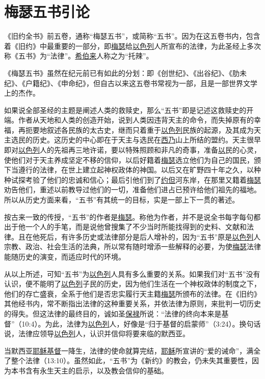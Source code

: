 \chapter{梅瑟五书引论}

《旧约全书》前五卷，通称“梅瑟五书”，或简称“五书”。因为在这五卷书内，包含着《旧约》中最重要的一部分，即\uline{梅瑟}给\uline{以色列}人所宣布的法律，为此圣经上多次称《五书》为“法律”。\uline{希伯来}人称之为“托辣”。

《梅瑟五书》虽然在纪元前已有如此的分划：即《创世纪》、《出谷纪》、《肋未纪》、《户籍纪》、《申命纪》，但自古以来这五卷书常视为一部，且是一部世界文学上的杰作。

如果说全部圣经的主题是阐述人类的救赎史，那么“五书”即是记述这救赎史的开端。作者从天地和人类的创造开始，说到人类因违背天主的命令，而失掉原有的幸福，再扼要地叙述各民族的太古史，继而只着重于\uline{以色列}民族的起源，及其成为天主选民的历史。这历史的中心即在于天主与选民在\uline{西乃}山上所结的盟约。天主很早即对\uline{以色列}人的先祖再三地许诺，要以特殊照顾和非凡的奇事，准备\uline{以}民的心灵，使他们对于天主养成坚定不移的信仰，以后好籍着\uline{梅瑟}选立他们为自己的国民，颁下当遵行的法律，在世上建立起神权政体的神国。以后又在旷野四十年之久，以种种试探考验了他们的忠诚和信心；最后引他们到了\uline{约但}河东岸，在那里又籍着\uline{梅瑟}劝告他们，重述以前教导过他们的一切，准备他们进占已预许给他们祖先的福地。所以从历史方面来看，“五书”有其统一的目标，实是一部上下一贯的著述。

按古来一致的传授，“五书”的作者是\uline{梅瑟}。称他为作者，并不是说全书每字每句都出于他一个人的手笔，而是说他曾搜集了不少当时所能找得到的史料、文献和法律。且在他死后，有许多历史或法律部分是后人增补的，因为“五书”原是\uline{以色列}人宗教、政治、社会生活的法典，所以常有随时增添一些解释的必要，为使\uline{梅瑟}法律能随历史的演变，而适应时代的环境。

从以上所述，可知“五书”为\uline{以色列}人具有多么重要的关系。如果我们对“五书”没有认识，便不能明了\uline{以色列}子民的历史，因为他们生活在一个神权政体的制度之下，他们的存亡盛衰，全系于他们是否忠实履行天主籍\uline{梅瑟}所颁布的法律。在《旧约》其他经书内，常不断指出法律的这种重要关系，并依法律为原则，来批判一切历史的得失。但这法律的最终目的，诚如圣\uline{保禄}所说：“法律的终向本来是基督”（10:4）。为此，法律为\uline{以色列}人，好像是“归于基督的启蒙师”（3:24）。换句话说，法律应领导\uline{以色列}人，认识并信仰将要来临的默西亚。

当默西亚\uline{耶稣}\uline{基督}一降生，法律的使命就算完结，\uline{耶稣}所宣讲的“爱的诫命”，满全了整个法律（13:10）。虽然如此，“五书”为《新约》的教会，仍未失其重要性，因为本书含有永生天主的启示，以及教会信仰的基础。